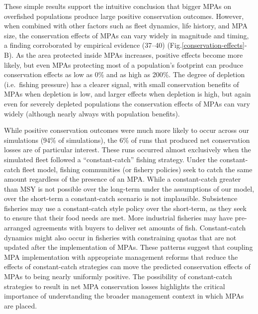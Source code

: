 \documentclass[9pt,twocolumn,twoside,lineno]{pnas-new}
\begin{document}
These simple results support the intuitive conclusion that bigger MPAs
on overfished populations produce large positive conservation outcomes.
However, when combined with other factors such as fleet dynamics, life
history, and MPA size, the conservation effects of MPAs can vary widely
in magnitude and timing, a finding corroborated by empirical evidence
(37--40) (Fig.\ref{conservation-effects}-B). As the area protected
inside MPAs increases, positive effects become more likely, but even
MPAs protecting most of a population's footprint can produce
conservation effects as low as 0\% and as high as 200\%. The degree of
depletion (i.e.~fishing pressure) has a clearer signal, with small
conservation benefits of MPAs when depletion is low, and larger effects
when depletion is high, but again even for severely depleted populations
the conservation effects of MPAs can vary widely (although nearly always
with population benefits).

While positive conservation outcomes were much more likely to occur
across our simulations (94\% of simulations), the 6\% of runs that
produced net conservation losses are of particular interest. These runs
occurred almost exclusively when the simulated fleet followed a
``constant-catch'' fishing strategy. Under the constant-catch fleet
model, fishing communities (or fishery policies) seek to catch the same
amount regardless of the presence of an MPA. While a constant-catch
greater than MSY is not possible over the long-term under the
assumptions of our model, over the short-term a constant-catch scenario
is not implausible. Subsistence fisheries may use a constant-catch style
policy over the short-term, as they seek to ensure that their food needs
are met. More industrial fisheries may have pre-arranged agreements with
buyers to deliver set amounts of fish. Constant-catch dynamics might
also occur in fisheries with constraining quotas that are not updated
after the implementation of MPAs. These patterns suggest that coupling
MPA implementation with appropriate management reforms that reduce the
effects of constant-catch strategies can move the predicted conservation
effects of MPAs to being nearly uniformly positive. The possibility of
constant-catch strategies to result in net MPA conservation losses
highlights the critical importance of understanding the broader
management context in which MPAs are placed.
\end{document}
